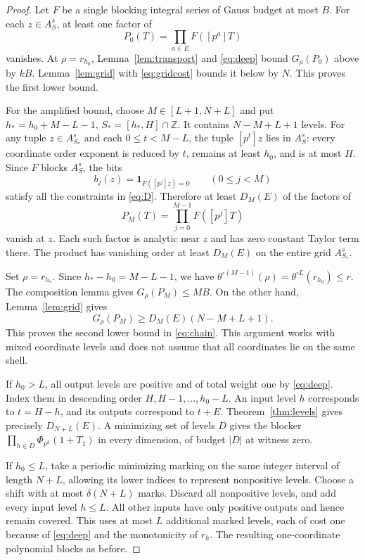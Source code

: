 \documentclass[11pt]{article}
\theoremstyle{definition}
\newcommand{\Z}{\mathbb Z}
\begin{document}
\begin{proof}
Let $F$ be a single blocking integral series of Gauss budget at most $B$. For each $z\in A_S^s$, at least one factor of
\[
 P_0(T)=\prod_{a\in E} F([p^a]T)
\]
vanishes. At $\rho=r_{h_0}$, Lemma~\ref{lem:transport} and \eqref{eq:deep} bound $G_\rho(P_0)$ above by $k B$. Lemma~\ref{lem:grid} with \eqref{eq:gridcost} bounds it below by $N$. This proves the first lower bound.

For the amplified bound, choose $M\in[L+1,N+L]$ and put $h_*=h_0+M-L-1$, $S_*=[h_*,H]\cap\Z$. It contains $N-M+L+1$ levels. For any tuple $z\in A_{S_*}^s$ and each $0\le t<M-L$, the tuple $[p^t]z$ lies in $A_S^s$: every coordinate order exponent is reduced by $t$, remains at least $h_0$, and is at most $H$. Since $F$ blocks $A_S^s$, the bits
\[
 b_j(z)=\mathbf1_{F([p^j]z)=0}\qquad (0\le j<M)
\]
satisfy all the constraints in \eqref{eq:D}. Therefore at least $D_M(E)$ of the factors of
\[
 P_M(T)=\prod_{j=0}^{M-1}F([p^j]T)
\]
vanish at $z$. Each such factor is analytic near $z$ and has zero constant Taylor term there. The product has vanishing order at least $D_M(E)$ on the entire grid $A_{S_*}^s$.

Set $\rho=r_{h_*}$. Since $h_*-h_0=M-L-1$, we have $\theta^{\circ(M-1)}(\rho)=\theta^{\circ L}(r_{h_0})\le r$. The composition lemma gives $G_\rho(P_M)\le MB$. On the other hand, Lemma~\ref{lem:grid} gives
\[
 G_\rho(P_M)\ge D_M(E)(N-M+L+1).
\]
This proves the second lower bound in \eqref{eq:chain}. This argument works with mixed coordinate levels and does not assume that all coordinates lie on the same shell.

If $h_0>L$, all output levels are positive and of total weight one by \eqref{eq:deep}. Index them in descending order $H,H-1,\dots,h_0-L$. An input level $h$ corresponds to $t=H-h$, and its outputs correspond to $t+E$. Theorem~\ref{thm:levels} gives precisely $D_{N+L}(E)$. A minimizing set of levels $D$ gives the blocker $\prod_{h\in D}\Phi_{p^h}(1+T_1)$ in every dimension, of budget $|D|$ at witness zero.

If $h_0\le L$, take a periodic minimizing marking on the same integer interval of length $N+L$, allowing its lower indices to represent nonpositive levels. Choose a shift with at most $\delta(N+L)$ marks. Discard all nonpositive levels, and add every input level $h\le L$. All other inputs have only positive outputs and hence remain covered. This uses at most $L$ additional marked levels, each of cost one because of \eqref{eq:deep} and the monotonicity of $r_h$. The resulting one-coordinate polynomial blocks as before.


\end{proof}
\end{document}
